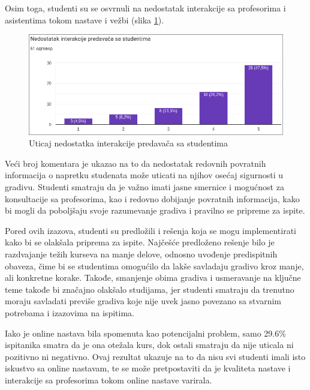 \documentclass[a4paper]{article}
\begin{document}
Osim toga, studenti su se osvrnuli na nedostatak interakcije sa profesorima i asistentima tokom nastave i vežbi (slika \ref{fig:nedostatak_interakcije}).

\begin{figure}[h!]
\begin{center}
\includegraphics[scale=0.37]{nedostatak_interakcije.png}
\end{center}
\caption{Uticaj nedostatka interakcije predavača sa studentima}
\label{fig:nedostatak_interakcije}
\end{figure}

Veći broj komentara je ukazao na to da nedostatak redovnih povratnih informacija o napretku studenata može uticati na njihov osećaj sigurnosti u gradivu. Studenti smatraju da je važno imati jasne smernice i mogućnost za konsultacije sa profesorima, kao i redovno dobijanje povratnih informacija, kako bi mogli da poboljšaju svoje razumevanje gradiva i pravilno se pripreme za ispite.

Pored ovih izazova, studenti su predložili i rešenja koja se mogu implementirati kako bi se olakšala priprema za ispite. Najčešće predloženo rešenje bilo je razdvajanje težih kurseva na manje delove, odnosno uvođenje predispitnih obaveza, čime bi se studentima omogućilo da lakše savladaju gradivo kroz manje, ali konkretne korake. Takođe, smanjenje obima gradiva i usmeravanje na ključne teme takođe bi značajno olakšalo studijama, jer studenti smatraju da trenutno moraju savladati previše gradiva koje nije uvek jasno povezano sa stvarnim potrebama i izazovima na ispitima.

Iako je online nastava bila spomenuta kao potencijalni problem, samo 29.6\% ispitanika smatra da je ona otežala kurs, dok ostali smatraju da nije uticala ni pozitivno ni negativno. Ovaj rezultat ukazuje na to da nisu svi studenti imali isto iskustvo sa online nastavam, te se može pretpostaviti da je kvaliteta nastave i interakcije sa profesorima tokom online nastave varirala.
\end{document}
